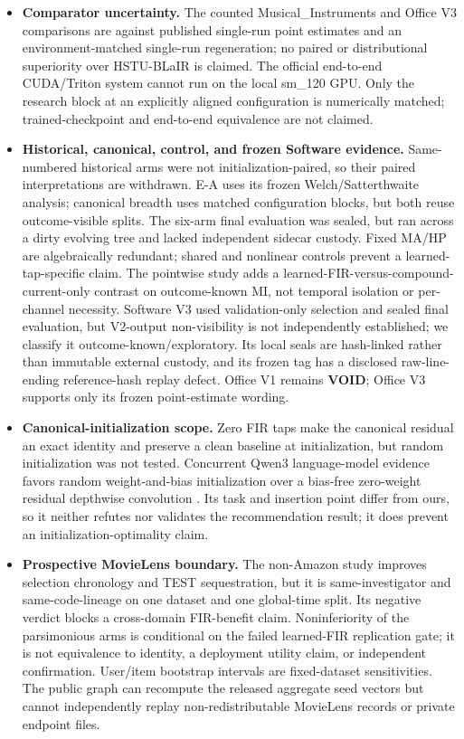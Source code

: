 \begin{itemize}
\tightlist
\item
  \textbf{Comparator uncertainty.} The counted Musical\_Instruments and Office V3 comparisons are against published single-run point estimates and an environment-matched single-run regeneration; no paired or distributional superiority over HSTU-BLaIR is claimed. The official end-to-end CUDA/Triton system cannot run on the local sm\_120 GPU. Only the research block at an explicitly aligned configuration is numerically matched; trained-checkpoint and end-to-end equivalence are not claimed.
\item
  \textbf{Historical, canonical, control, and frozen Software evidence.} Same-numbered historical arms were not initialization-paired, so their paired interpretations are withdrawn.
E-A uses its frozen Welch/Satterthwaite analysis; canonical breadth uses matched configuration blocks, but both reuse outcome-visible splits.
The six-arm final evaluation was sealed, but ran across a dirty evolving tree and lacked independent sidecar custody.
Fixed MA/HP are algebraically redundant; shared and nonlinear controls prevent a learned-tap-specific claim.
The pointwise study adds a learned-FIR-versus-compound-current-only contrast on outcome-known MI, not temporal isolation or per-channel necessity.
Software V3 used validation-only selection and sealed final evaluation, but V2-output non-visibility is not independently established; we classify it outcome-known/exploratory. Its local seals are hash-linked rather than immutable external custody, and its frozen tag has a disclosed raw-line-ending reference-hash replay defect.
Office V1 remains \textbf{VOID}; Office V3 supports only its frozen point-estimate wording.
\item
  \textbf{Canonical-initialization scope.} Zero FIR taps make the canonical residual an exact identity and preserve a clean baseline at initialization, but random initialization was not tested. Concurrent Qwen3 language-model evidence favors random weight-and-bias initialization over a bias-free zero-weight residual depthwise convolution \citep{tian2026convllm}. Its task and insertion point differ from ours, so it neither refutes nor validates the recommendation result; it does prevent an initialization-optimality claim.
\item
  \textbf{Prospective MovieLens boundary.} The non-Amazon study improves selection chronology and TEST sequestration, but it is same-investigator and same-code-lineage on one dataset and one global-time split. Its negative verdict blocks a cross-domain FIR-benefit claim. Noninferiority of the parsimonious arms is conditional on the failed learned-FIR replication gate; it is not equivalence to identity, a deployment utility claim, or independent confirmation. User/item bootstrap intervals are fixed-dataset sensitivities. The public graph can recompute the released aggregate seed vectors but cannot independently replay non-redistributable MovieLens records or private endpoint files.

\end{itemize}
